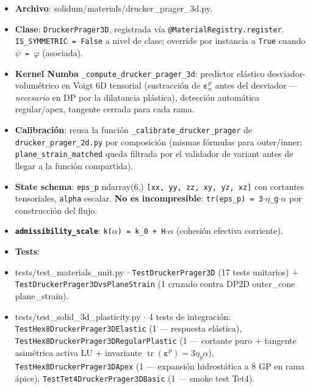 \documentclass[11pt,letterpaper,oneside]{report}
\begin{document}
\begin{itemize}
  \item \textbf{Archivo}: solidum/materials/drucker\_prager\_3d.py.
  \item \textbf{Clase}: \texttt{DruckerPrager3D}, registrada vía \texttt{@MaterialRegistry.register}. \texttt{IS\_SYMMETRIC = False} a nivel de clase; override por instancia a \texttt{True} cuando \texttt{\ensuremath{\psi} = \ensuremath{\varphi}} (asociada).
  \item \textbf{Kernel Numba} \texttt{\_compute\_drucker\_prager\_3d}: predictor elástico desviador-volumétrico en Voigt 6D tensorial (sustracción de $\boldsymbol\varepsilon^p_n$ antes del desviador --- \textit{necesario} en DP por la dilatancia plástica), detección automática regular/apex, tangente cerrada para cada rama.
  \item \textbf{Calibración}: reusa la función \texttt{\_calibrate\_drucker\_prager} de \texttt{drucker\_prager\_2d.py} por composición (mismas fórmulas para outer/inner; \texttt{plane\_strain\_matched} queda filtrada por el validador de variant antes de llegar a la función compartida).
  \item \textbf{State schema}: \texttt{eps\_p} ndarray(6,) \texttt{[xx, yy, zz, xy, yz, xz]} con cortantes tensoriales, \texttt{alpha} escalar. \textbf{No es incompresible}: \texttt{tr(eps\_p) = 3\ensuremath{\cdot}\ensuremath{\eta}\_g\ensuremath{\cdot}\ensuremath{\alpha}} por construcción del flujo.
  \item \textbf{\texttt{admissibility\_scale}}: \texttt{k(\ensuremath{\alpha}) = k\_0 + H\ensuremath{\cdot}\ensuremath{\alpha}} (cohesión efectiva corriente).
  \item \textbf{Tests}:
  \item tests/test\_materials\_unit.py \ensuremath{\cdot} \texttt{TestDruckerPrager3D} (17 tests unitarios) + \texttt{TestDruckerPrager3DvsPlaneStrain} (1 cruzado contra DP2D outer\_cone plane\_strain).
  \item tests/test\_solid\_3d\_plasticity.py \ensuremath{\cdot} 4 tests de integración: \texttt{TestHex8DruckerPrager3DElastic} (1 --- respuesta elástica), \texttt{TestHex8DruckerPrager3DRegularPlastic} (1 --- cortante puro + tangente asimétrica activa LU + invariante $\operatorname{tr}(\boldsymbol\varepsilon^p) = 3\eta_g\alpha$), \texttt{TestHex8DruckerPrager3DApex} (1 --- expansión hidrostática a 8 GP en rama ápice), \texttt{TestTet4DruckerPrager3DBasic} (1 --- smoke test Tet4).
\end{itemize}
\end{document}
